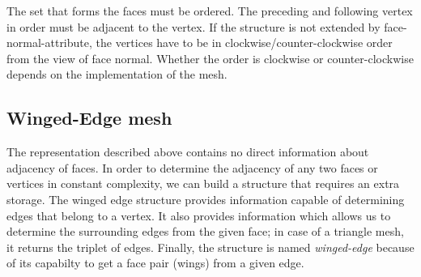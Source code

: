 The set that forms the faces must be ordered. The preceding and following vertex in order must be 
adjacent to
the vertex. If the structure is not extended by face-normal-attribute, the vertices have to be in 
clockwise/counter-clockwise order from the view of face normal. Whether the order is clockwise or counter-clockwise
depends on the implementation of the mesh.

\subsection{Winged-Edge mesh}

The representation described above contains no direct information about adjacency of faces. 
In order to determine the adjacency of any two faces or vertices in constant complexity, we
can build a structure that requires an extra storage. The winged edge structure\cite{Baumgart1972}
provides information
capable of determining edges that belong to a vertex. It also provides information which allows us
to determine the surrounding edges from the given face;
in case of a triangle mesh, it returns the triplet of edges.
Finally, the structure is named \emph{winged-edge} because of its
capabilty to get a face pair (wings) from
a given edge.

